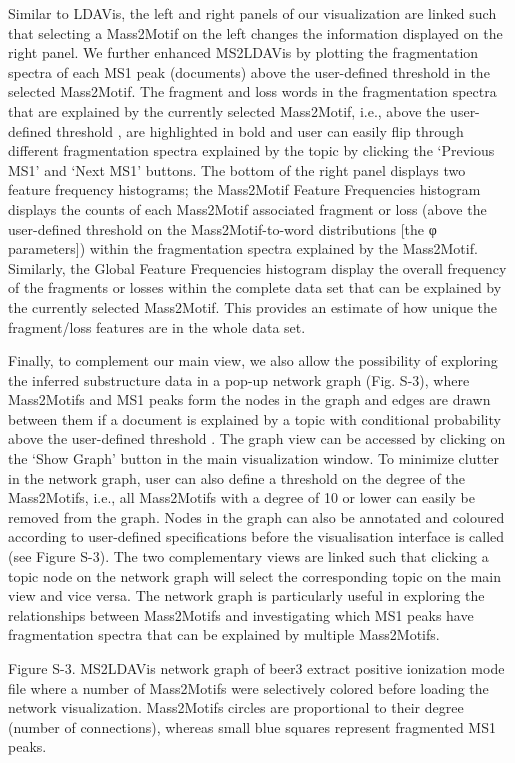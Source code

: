 Similar to LDAVis, the left and right panels of our visualization are linked such that selecting a Mass2Motif on the left changes the information displayed on the right panel. We further enhanced MS2LDAVis by plotting the fragmentation spectra of each MS1 peak (documents) above the user-defined threshold  in the selected Mass2Motif. The fragment and loss words in the fragmentation spectra that are explained by the currently selected Mass2Motif, i.e., above the user-defined threshold , are highlighted in bold and user can easily flip through different fragmentation spectra explained by the topic by clicking the ‘Previous MS1’ and ‘Next MS1’ buttons. The bottom of the right panel displays two feature frequency histograms; the Mass2Motif Feature Frequencies histogram displays the counts of each Mass2Motif associated fragment or loss (above the user-defined threshold  on the Mass2Motif-to-word distributions [the φ parameters]) within the fragmentation spectra explained by the Mass2Motif. Similarly, the Global Feature Frequencies histogram display the overall frequency of the fragments or losses within the complete data set that can be explained by the currently selected Mass2Motif. This provides an estimate of how unique the fragment/loss features are in the whole data set.

Finally, to complement our main view, we also allow the possibility of exploring the inferred substructure data in a pop-up network graph (Fig. S-3), where Mass2Motifs and MS1 peaks form the nodes in the graph and edges are drawn between them if a document is explained by a topic with conditional probability above the user-defined threshold . The graph view can be accessed by clicking on the ‘Show Graph’ button in the main visualization window. To minimize clutter in the network graph, user can also define a threshold on the degree of the Mass2Motifs, i.e., all Mass2Motifs with a degree of 10 or lower can easily be removed from the graph. Nodes in the graph can also be annotated and coloured according to user-defined specifications before the visualisation interface is called (see Figure S-3). The two complementary views are linked such that clicking a topic node on the network graph will select the corresponding topic on the main view and vice versa. The network graph is particularly useful in exploring the relationships between Mass2Motifs and investigating which MS1 peaks have fragmentation spectra that can be explained by multiple Mass2Motifs.

Figure S-3. MS2LDAVis network graph of beer3 extract positive ionization mode file where a number of Mass2Motifs were selectively colored before loading the network visualization. Mass2Motifs circles are proportional to their degree (number of connections), whereas small blue squares represent fragmented MS1 peaks.

